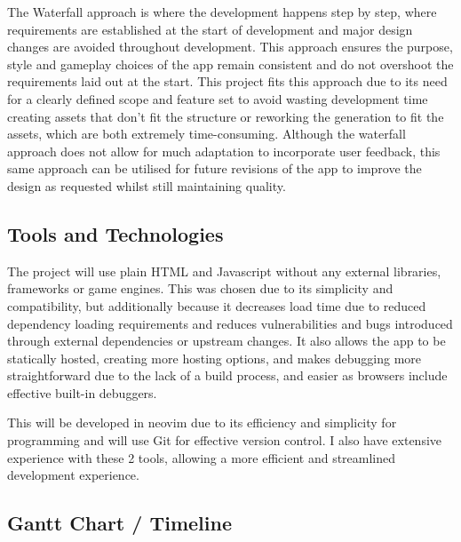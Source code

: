 \documentclass[14pt]{article}
\begin{document}
The Waterfall approach is where the development happens step by step, where requirements are established at the start of development and major design changes are avoided throughout development.
This approach ensures the purpose, style and gameplay choices of the app remain consistent and do not overshoot the requirements laid out at the start.
This project fits this approach due to its need for a clearly defined scope and feature set to avoid wasting development time creating assets that don't fit the structure or reworking the generation to fit the assets, which are both extremely time-consuming.
Although the waterfall approach does not allow for much adaptation to incorporate user feedback, this same approach can be utilised for future revisions of the app to improve the design as requested whilst still maintaining quality.

\subsection{Tools and Technologies}
The project will use plain HTML and Javascript without any external libraries, frameworks or game engines.
This was chosen due to its simplicity and compatibility, but additionally because it decreases load time due to reduced dependency loading requirements and reduces vulnerabilities and bugs introduced through external dependencies or upstream changes.
It also allows the app to be statically hosted, creating more hosting options, and makes debugging more straightforward due to the lack of a build process, and easier as browsers include effective built-in debuggers.

This will be developed in neovim due to its efficiency and simplicity for programming and will use Git for effective version control.
I also have extensive experience with these 2 tools, allowing a more efficient and streamlined development experience.

\subsection{Gantt Chart / Timeline}
\end{document}
